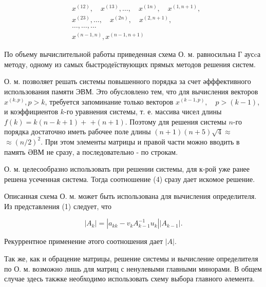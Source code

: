 \documentclass[10pt]{article}
\begin{document}
\[

\begin{aligned}

& x^{(12)}, \quad x^{(13)}, \ldots, \quad x^{(1 n)}, \quad x^{(1, n+1)}, \\

& x^{(23)}, \ldots, \quad x^{(2 n)}, \quad x^{(2, n+1)} \text {, } \\

& \ldots, \ldots, \ldots \\

& x^{(n-1, n)}, x^{(n-1, n+1)}

\end{aligned}

\]



По объему вычислительной работы приведенная схема О. м. равносильна Г аусcа методу, одному из самых быстродеїствующих прямых методов решения систем.



О. м. позволяет решать системы повышенного порядка за счет әфффективного использования памяти ЭВМ. Это обусловлено тем, что для вычисления векторов $x^{(k, p)}, p>k$, требуется запоминание только векторов $x^{(k-1, p)}, \quad p>(k-1)$, и коэффициентов $k$-го уравнения системы, т. е. массива чисел длины $f(k)=k(n-k+1)+$ $+(n+1)$. Поэтому для решения системы $n$-го порядка достаточно иметь рабочее поле длины $(n+1)(n+5) \sqrt{4} \approx$ $\approx(n / 2)^{2}$. При этом элементы матрицы и правой части можно вводить в память ӘВМ не сразу, а последовательно - по строкам.



О. м. целесообразно использовать при решении системы, для к-рой уже ранее решена усеченная система. Тогда соотношение (4) сразу дает искомое решение.



Описанная схема О. м. может быть использована для вычисления определителя. Из представления (1) следует, что



\[

\left|A_{k}\right|=\left|a_{k k}-v_{k} A_{k-1}^{-1} u_{k}\right|\left|A_{k-1}\right| .

\]



Рекуррентное применение әтого соотношения дает $|A|$.



Так же, как и обрацение матрицы, решение системы и вычисление определителя по О. м. возможно лишь для матриц с ненулевыми главными минорами. В общем случае здесь такжке необходимо использовать схему выбора главного әлемента.
\end{document}
